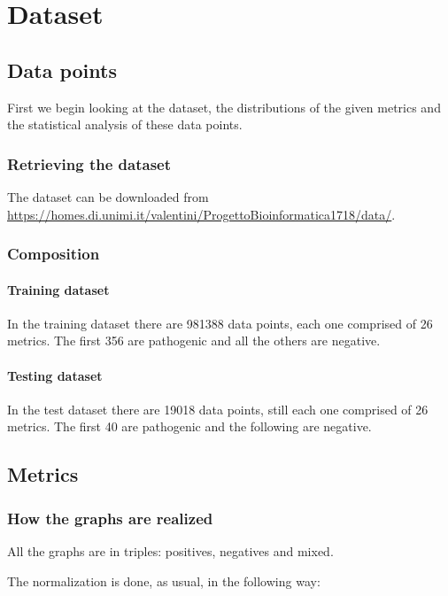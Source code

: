 \providecommand{\main}{.}

\usepackage{booktabs}




{\hypersetup{hidelinks}
	\tableofcontents  %
}
\part{Dataset}
\chapter{Data points}
First we begin looking at the dataset, the distributions of the given metrics and the statistical analysis of these data points.

\section{Retrieving the dataset}
The dataset can be downloaded from \url{https://homes.di.unimi.it/valentini/ProgettoBioinformatica1718/data/}.

\section{Composition}
\subsection{Training dataset}
In the training dataset there are 981388 data points, each one comprised of 26 metrics. The first 356 are pathogenic and all the others are negative.

\subsection{Testing dataset}
In the test dataset there are 19018 data points, still each one comprised of 26 metrics. The first 40 are pathogenic and the following are negative.

\chapter{Metrics}
\section{How the graphs are realized}
All the graphs are in triples: positives, negatives and mixed.

The normalization is done, as usual, in the following way:

